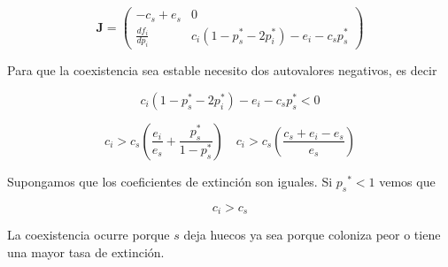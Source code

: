 \documentclass[twocolumn,aps,prl]{revtex4-1}
\begin{document}
\begin{equation}
    \mathbf{J}=\left(
    \begin{array}{cc}
        -c_{s}+e_{s} & 0 \\
        \frac{d f_{i}}{d p_{i}} & c_{i}\left(1-p_{s}^{*}-2 p_{i}^{*}\right)-e_{i}-c_{s} p_{s}^{*}
    \end{array}
    \right)
\end{equation}

Para que la coexistencia sea estable necesito dos autovalores negativos, es decir

$$
c_{i}\left(1-p_{s}^{*}-2 p_{i}^{*}\right)-e_{i}-c_{s} p_{s}^{*}<0
$$

$$
c_{i}>c_{s}\left(\frac{e_{i}}{e_{s}}+\frac{p_{s}^{*}}{1-p_{s}^{*}}\right) \quad c_{i}>c_{s}\left(\frac{c_{s}+e_{i}-e_{s}}{e_{s}}\right)
$$

Supongamos que los coeficientes de extinción son iguales. Si $p_{s}{ }^{*}<1$ vemos que

$$
c_{i}>c_{s}
$$

La coexistencia ocurre porque $s$ deja huecos ya sea porque coloniza peor o tiene una mayor tasa de extinción.

% 
\end{document}
